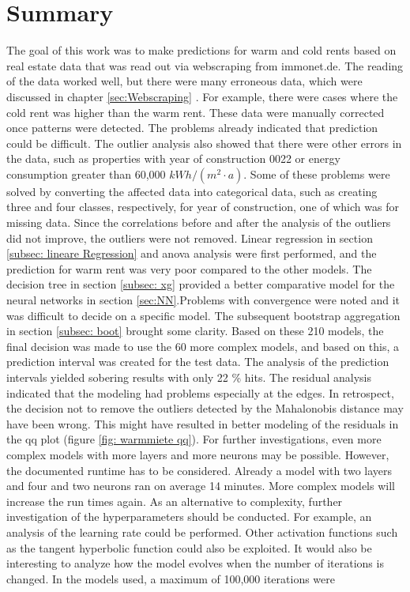 \documentclass[11pt,a4paper]{scrreprt}
\begin{document}
	
	\tableofcontents
	\listoffigures
	\listoftables
	\thispagestyle{empty}
	\cleardoublepage{}
	
	
	
	
	

	\chapter{Summary} \label{sec: Fazit}
	The goal of this work was to make predictions for warm and cold rents based on real estate data that was read out via webscraping from immonet.de. The reading of the data worked well, but there were many erroneous data, which were discussed in chapter \ref{sec:Webscraping} . For example, there were cases where the cold rent was higher than the warm rent. These data were manually corrected once patterns were detected. The problems already indicated that prediction could be difficult. The outlier analysis also showed that there were other errors in the data, such as properties with year of construction 0022 or energy consumption greater than 60,000 $kWh/(m^2 \cdot a)$.	Some of these problems were solved by converting the affected data into categorical data, such as creating three and four classes, respectively, for year of construction, one of which was for missing data. Since the correlations before and after the analysis of the outliers did not improve, the outliers were not removed. Linear regression in section \ref{subsec: lineare Regression} and anova analysis were first performed, and the prediction for warm rent was very poor compared to the other models.  The decision tree in section \ref{subsec: xg} provided a better comparative model for the neural networks in section \ref{sec:NN}.Problems with convergence were noted and it was difficult to decide on a specific model. The subsequent bootstrap aggregation in section \ref{subsec: boot} brought some clarity. Based on these 210 models, the final decision was made to use the 60 more complex models, and based on this, a prediction interval was created for the test data. The analysis of the prediction intervals yielded sobering results with only 22 \% hits. The residual analysis indicated that the modeling had problems especially at the edges. In retrospect, the decision not to remove the outliers detected by the Mahalonobis distance may have been wrong. This might have resulted in better modeling of the residuals in the qq plot	 (figure \ref{fig: warmmiete qq}). For further investigations, even more complex models with more layers and more neurons may be possible. However, the documented runtime has to be considered. Already a model with two layers and four and two neurons ran on average 14 minutes. More complex models will increase the run times again. As an alternative to complexity, further investigation of the hyperparameters should be conducted. For example, an analysis of the learning rate could be performed. Other activation functions such as the tangent hyperbolic function could also be exploited. It would also be interesting to analyze how the model evolves when the number of iterations is changed. In the models used, a maximum of 100,000 iterations were 
\end{document}

